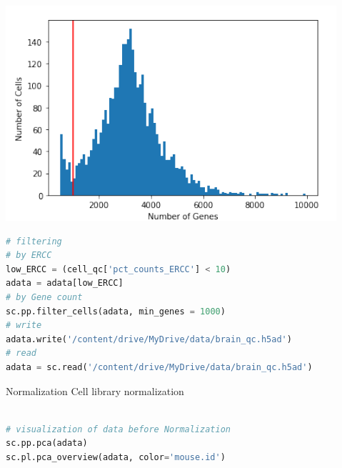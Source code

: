 \documentclass{article}
\begin{document}
\includegraphics[]{Table-3.png}
\begin{lstlisting}[language=Python]
# filtering
# by ERCC
low_ERCC = (cell_qc['pct_counts_ERCC'] < 10)
adata = adata[low_ERCC]
# by Gene count
sc.pp.filter_cells(adata, min_genes = 1000)
# write
adata.write('/content/drive/MyDrive/data/brain_qc.h5ad')
# read
adata = sc.read('/content/drive/MyDrive/data/brain_qc.h5ad')
\end{lstlisting}

 Normalization
\newline Cell library normalization
\begin{lstlisting}[language=python]

# visualization of data before Normalization
sc.pp.pca(adata)
sc.pl.pca_overview(adata, color='mouse.id')
\end{lstlisting}
\end{document}

